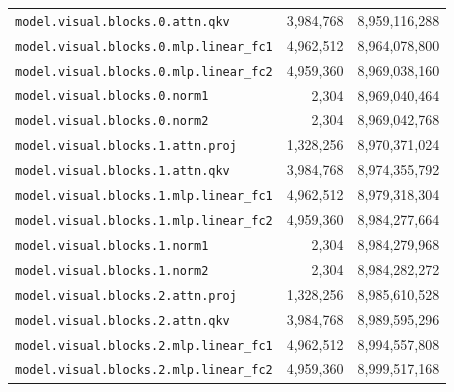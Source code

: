 \documentclass[10pt,a4paper]{article}
\theoremstyle{definition}
\begin{document}
\begin{appendices}
\begin{longtable}{p{9.5cm}rr}
\texttt{model.\allowbreak{}visual.\allowbreak{}blocks.\allowbreak{}0.\allowbreak{}attn.\allowbreak{}qkv} & 3,984,768 & 8,959,116,288 \\
\texttt{model.\allowbreak{}visual.\allowbreak{}blocks.\allowbreak{}0.\allowbreak{}mlp.\allowbreak{}linear\_fc1} & 4,962,512 & 8,964,078,800 \\
\texttt{model.\allowbreak{}visual.\allowbreak{}blocks.\allowbreak{}0.\allowbreak{}mlp.\allowbreak{}linear\_fc2} & 4,959,360 & 8,969,038,160 \\
\texttt{model.\allowbreak{}visual.\allowbreak{}blocks.\allowbreak{}0.\allowbreak{}norm1} & 2,304 & 8,969,040,464 \\
\texttt{model.\allowbreak{}visual.\allowbreak{}blocks.\allowbreak{}0.\allowbreak{}norm2} & 2,304 & 8,969,042,768 \\
\texttt{model.\allowbreak{}visual.\allowbreak{}blocks.\allowbreak{}1.\allowbreak{}attn.\allowbreak{}proj} & 1,328,256 & 8,970,371,024 \\
\texttt{model.\allowbreak{}visual.\allowbreak{}blocks.\allowbreak{}1.\allowbreak{}attn.\allowbreak{}qkv} & 3,984,768 & 8,974,355,792 \\
\texttt{model.\allowbreak{}visual.\allowbreak{}blocks.\allowbreak{}1.\allowbreak{}mlp.\allowbreak{}linear\_fc1} & 4,962,512 & 8,979,318,304 \\
\texttt{model.\allowbreak{}visual.\allowbreak{}blocks.\allowbreak{}1.\allowbreak{}mlp.\allowbreak{}linear\_fc2} & 4,959,360 & 8,984,277,664 \\
\texttt{model.\allowbreak{}visual.\allowbreak{}blocks.\allowbreak{}1.\allowbreak{}norm1} & 2,304 & 8,984,279,968 \\
\texttt{model.\allowbreak{}visual.\allowbreak{}blocks.\allowbreak{}1.\allowbreak{}norm2} & 2,304 & 8,984,282,272 \\
\texttt{model.\allowbreak{}visual.\allowbreak{}blocks.\allowbreak{}2.\allowbreak{}attn.\allowbreak{}proj} & 1,328,256 & 8,985,610,528 \\
\texttt{model.\allowbreak{}visual.\allowbreak{}blocks.\allowbreak{}2.\allowbreak{}attn.\allowbreak{}qkv} & 3,984,768 & 8,989,595,296 \\
\texttt{model.\allowbreak{}visual.\allowbreak{}blocks.\allowbreak{}2.\allowbreak{}mlp.\allowbreak{}linear\_fc1} & 4,962,512 & 8,994,557,808 \\
\texttt{model.\allowbreak{}visual.\allowbreak{}blocks.\allowbreak{}2.\allowbreak{}mlp.\allowbreak{}linear\_fc2} & 4,959,360 & 8,999,517,168 \\

\end{longtable}
\end{appendices}
\end{document}
